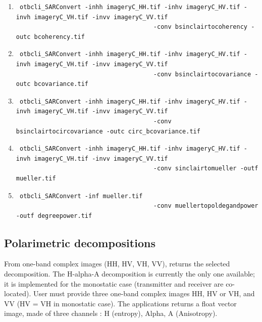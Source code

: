 \begin{enumerate}
\item \begin{verbatim} otbcli_SARConvert -inhh imageryC_HH.tif -inhv imageryC_HV.tif -invh imageryC_VH.tif -invv imageryC_VV.tif
									  -conv bsinclairtocoherency -outc bcoherency.tif \end{verbatim}
									  
\item \begin{verbatim} otbcli_SARConvert -inhh imageryC_HH.tif -inhv imageryC_HV.tif -invh imageryC_VH.tif -invv imageryC_VV.tif 
									  -conv bsinclairtocovariance -outc bcovariance.tif \end{verbatim}
									  
\item \begin{verbatim} otbcli_SARConvert -inhh imageryC_HH.tif -inhv imageryC_HV.tif -invh imageryC_VH.tif -invv imageryC_VV.tif
									  -conv bsinclairtocircovariance -outc circ_bcovariance.tif \end{verbatim}
									  
									  
\item \begin{verbatim} otbcli_SARConvert -inhh imageryC_HH.tif -inhv imageryC_HV.tif -invh imageryC_VH.tif -invv imageryC_VV.tif 
									  -conv sinclairtomueller -outf mueller.tif \end{verbatim}
									  
\item \begin{verbatim} otbcli_SARConvert -inf mueller.tif 
									  -conv muellertopoldegandpower -outf degreepower.tif \end{verbatim}
									  
\end{enumerate}

\subsection{Polarimetric decompositions}\label{ssec:poldecomp}

From one-band complex images (HH, HV, VH, VV), returns the selected decomposition.
The H-alpha-A decomposition is currently the only one available; it is implemented for the monostatic case (transmitter and receiver are co-located).
User must provide three one-band complex images HH, HV or VH, and VV (HV = VH in monostatic case).
The applications returns a float vector image, made of three channels : H (entropy), Alpha, A (Anisotropy).

